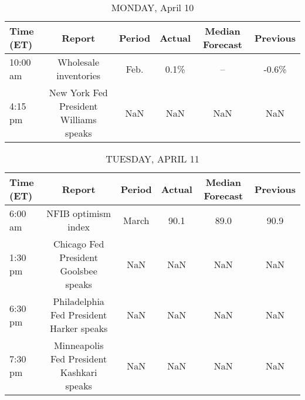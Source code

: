 \documentclass{article}%
\begin{document}
%
\normalsize%


\begin{table}[htbp]%
\caption{MONDAY, April 10}%
\centering%
\begin{adjustbox}{width=1\textwidth}%
\begin{tabular}{lccccc}
\toprule
Time (ET) &                                 Report & Period & Actual & Median Forecast & Previous \\
\midrule
 10:00 am &                  Wholesale inventories &   Feb. &   0.1\% &              -- &    -0.6\% \\
  4:15 pm & New York Fed President Williams speaks &    NaN &    NaN &             NaN &      NaN \\
\bottomrule
\end{tabular}
%
\end{adjustbox}%
\end{table}

%


\begin{table}[htbp]%
\caption{TUESDAY, APRIL 11}%
\centering%
\begin{adjustbox}{width=1\textwidth}%
\begin{tabular}{lccccc}
\toprule
Time (ET) &                                    Report & Period & Actual & Median Forecast & Previous \\
\midrule
  6:00 am &                       NFIB optimism index &  March &   90.1 &            89.0 &     90.9 \\
  1:30 pm &     Chicago Fed President Goolsbee speaks &    NaN &    NaN &             NaN &      NaN \\
  6:30 pm &  Philadelphia Fed President Harker speaks &    NaN &    NaN &             NaN &      NaN \\
  7:30 pm & Minneapolis Fed President Kashkari speaks &    NaN &    NaN &             NaN &      NaN \\
\bottomrule
\end{tabular}
%
\end{adjustbox}%
\end{table}

%
\end{document}
